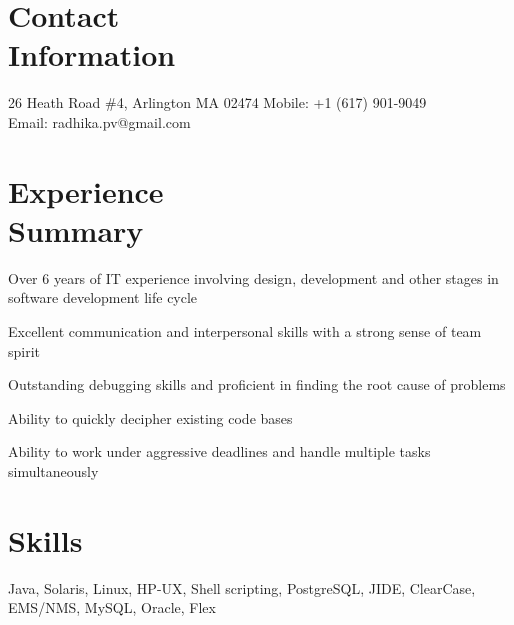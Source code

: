 \documentclass[margin]{resume}
\begin{document}
\begin{resume}

    \section{\mysidestyle Contact\\Information}

    26 Heath Road \#4, Arlington MA 02474   \hfill Mobile: +1 (617) 901-9049          \\
    Email: radhika.pv@gmail.com \\

			\vspace{-5mm}
    \section{\mysidestyle Experience \\ Summary}
		\begin{list2}
    \item Over 6 years of IT experience involving design, development and other stages in software development life cycle
    \item Excellent communication and interpersonal skills with a strong sense of team spirit
    \item Outstanding debugging skills and proficient in finding the root cause of problems
    \item Ability to quickly decipher existing code bases
		\item Ability to work under aggressive deadlines and handle multiple tasks simultaneously
		\end{list2}

    \section{\mysidestyle Skills}
		Java, Solaris, Linux, HP-UX, Shell scripting, PostgreSQL, JIDE, ClearCase, EMS/NMS, MySQL, Oracle, Flex


\end{resume}
\end{document}
